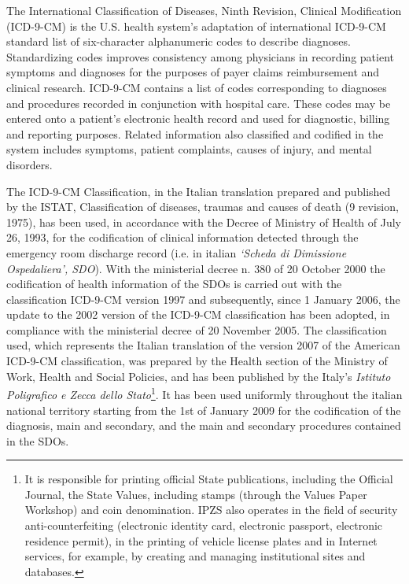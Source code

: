 The International Classification of Diseases, Ninth Revision, Clinical Modification (ICD-9-CM) is the U.S. health system's adaptation of international ICD-9-CM standard list of six-character alphanumeric codes to describe diagnoses. Standardizing codes improves consistency among physicians in recording patient symptoms and diagnoses for the purposes of payer claims reimbursement and clinical research.
ICD-9-CM contains a list of codes corresponding to diagnoses and procedures recorded in conjunction with hospital care. These codes may be entered onto a patient's electronic health record and used for diagnostic, billing and reporting purposes. Related information also classified and codified in the system includes symptoms, patient complaints, causes of injury, and mental disorders.


The ICD-9-CM Classification, in the Italian translation prepared and published by the ISTAT, Classification of diseases, traumas and causes of death (9 revision, 1975), has been used, in accordance with the Decree of Ministry of Health of July 26, 1993, for the codification of clinical information detected through the emergency room discharge record (i.e. in italian \textit{\enquote*{Scheda di Dimissione Ospedaliera}, SDO}). With the ministerial decree n. 380 of 20 October 2000 the codification of health information of the SDOs is carried out with the classification ICD-9-CM version 1997 and subsequently, since 1 January 2006, the update to the 2002 version of the ICD-9-CM classification has been adopted, in compliance with the ministerial decree of 20 November 2005.
The classification used, which represents the Italian translation of the version 2007 of the American ICD-9-CM classification, was prepared by the Health section of the Ministry of Work, Health and Social Policies, and has been published by the Italy's \textit{Istituto Poligrafico e Zecca dello Stato}\footnote{It is responsible for printing official State publications, including the Official Journal, the State Values, including stamps (through the Values Paper Workshop) and coin denomination. IPZS also operates in the field of security anti-counterfeiting (electronic identity card, electronic passport, electronic residence permit), in the printing of vehicle license plates and in Internet services, for example, by creating and managing institutional sites and databases.}. It has been used uniformly throughout the italian national territory starting from the 1st of January 2009 for the codification of the diagnosis, main and secondary, and the main and secondary procedures contained in the SDOs.



